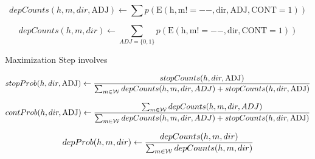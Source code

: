 \documentclass{article}
\begin{document}
\[depCounts(h, m, dir, \mathrm{ADJ}) \gets
 \sum p(\mathrm{E(h, m!=--, dir, ADJ, CONT = 1)}) \]

\[depCounts(h, m, dir) \gets
 \sum\limits_{ADJ=\{0,1\}} p(\mathrm{E(h, m!=--, dir, CONT = 1)}) \]

Maximization Step involves

  \[stopProb(h, dir, \mathrm{ADJ}) \gets 
  \frac{stopCounts(h, dir, \mathrm{ADJ})}{
    \sum_{m \in {\cal W}} depCounts(h, m, dir, ADJ) + stopCounts(h, dir, \mathrm{ADJ})} 
  \]

  \[contProb(h, dir, \mathrm{ADJ}) \gets 
  \frac{\sum_{m \in {\cal W}} depCounts(h, m, dir, ADJ)}{
    \sum_{m \in {\cal W}} depCounts(h, m, dir, ADJ) + stopCounts(h, dir, \mathrm{ADJ})} 
  \]

  \[depProb(h, m, dir) \gets 
  \frac{depCounts(h, m, dir)}{
    \sum_{m \in {\cal W}} depCounts(h, m, dir)}
  \]
\end{document}
